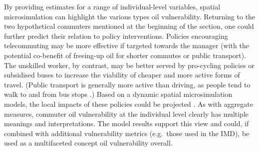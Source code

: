 By providing estimates for a range of individual-level variables, spatial
microsimulation can highlight the various types oil vulnerability.
Returning to the two hypothetical commuters mentioned at the beginning of
the section, one could further predict their relation to policy interventions.
Policies encouraging telecommuting
may be more effective if targeted towards the manager (with the potential
co-benefit of freeing-up oil for shorter commutes or public transport). The
unskilled worker, by contrast, may be better served by pro-cycling policies
or subsidised buses to
increase the viability of cheaper and more active forms of
travel. (Public transport is generally more active than driving, as people
tend to walk to and from bus stops \citep{Besser2005-active}.)
Based on a dynamic spatial microsimulation models, the local impacts of these
policies could be projected \citep{Ballas2005-ireland}. As with
aggregate measures, commuter oil vulnerability at the individual level clearly
has
multiple meanings and interpretations.
The model results support this view and could, if combined with additional
vulnerability metrics (e.g.~those used in the IMD),
be used as a multifaceted concept oil vulnerability overall.

